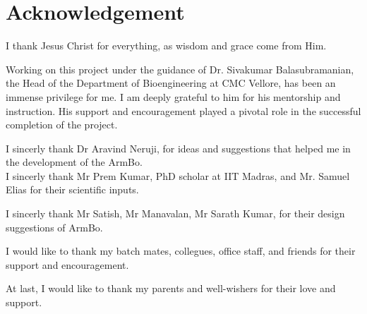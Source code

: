 \documentclass[12pt, twoside]{report}
\begin{document}
\chapter*{Acknowledgement}


I thank Jesus Christ for everything, as wisdom and grace come from Him.\par
\noindent Working on this project under the guidance of Dr. Sivakumar Balasubramanian, 
the Head of the Department of Bioengineering at CMC Vellore, has been an immense privilege for me. 
I am deeply grateful to him for his mentorship and instruction. 
His support and encouragement played a pivotal role in the successful completion of the project.\par

\noindent I sincerly thank Dr Aravind Neruji, for ideas and suggestions that helped me in the development of the ArmBo.\\
\noindent I sincerly thank Mr Prem Kumar, PhD scholar at IIT Madras, and Mr. Samuel Elias for their scientific inputs.\par
\noindent I sincerly thank Mr Satish, Mr Manavalan, Mr Sarath Kumar, for their design suggestions of ArmBo. \par
\noindent I would like to thank my batch mates, collegues, office staff, and friends for their support and encouragement.\par
\noindent At last, I would like to thank my parents and well-wishers for their love and support.  \par
\end{document}
